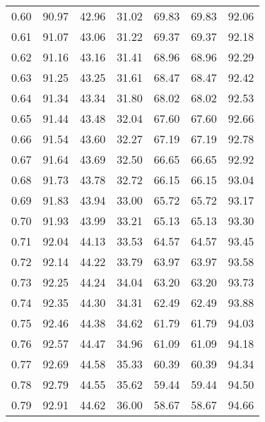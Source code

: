\begin{tabular}{|c|c|c|c|c|c|c|}
      0.60 &     90.97 &     42.96 &      31.02 &   69.83 &      69.83 &         92.06 \\
      0.61 &     91.07 &     43.06 &      31.22 &   69.37 &      69.37 &         92.18 \\
      0.62 &     91.16 &     43.16 &      31.41 &   68.96 &      68.96 &         92.29 \\
      0.63 &     91.25 &     43.25 &      31.61 &   68.47 &      68.47 &         92.42 \\
      0.64 &     91.34 &     43.34 &      31.80 &   68.02 &      68.02 &         92.53 \\
      0.65 &     91.44 &     43.48 &      32.04 &   67.60 &      67.60 &         92.66 \\
      0.66 &     91.54 &     43.60 &      32.27 &   67.19 &      67.19 &         92.78 \\
      0.67 &     91.64 &     43.69 &      32.50 &   66.65 &      66.65 &         92.92 \\
      0.68 &     91.73 &     43.78 &      32.72 &   66.15 &      66.15 &         93.04 \\
      0.69 &     91.83 &     43.94 &      33.00 &   65.72 &      65.72 &         93.17 \\
      0.70 &     91.93 &     43.99 &      33.21 &   65.13 &      65.13 &         93.30 \\
      0.71 &     92.04 &     44.13 &      33.53 &   64.57 &      64.57 &         93.45 \\
      0.72 &     92.14 &     44.22 &      33.79 &   63.97 &      63.97 &         93.58 \\
      0.73 &     92.25 &     44.24 &      34.04 &   63.20 &      63.20 &         93.73 \\
      0.74 &     92.35 &     44.30 &      34.31 &   62.49 &      62.49 &         93.88 \\
      0.75 &     92.46 &     44.38 &      34.62 &   61.79 &      61.79 &         94.03 \\
      0.76 &     92.57 &     44.47 &      34.96 &   61.09 &      61.09 &         94.18 \\
      0.77 &     92.69 &     44.58 &      35.33 &   60.39 &      60.39 &         94.34 \\
      0.78 &     92.79 &     44.55 &      35.62 &   59.44 &      59.44 &         94.50 \\
      0.79 &     92.91 &     44.62 &      36.00 &   58.67 &      58.67 &         94.66 \\

\end{tabular}
